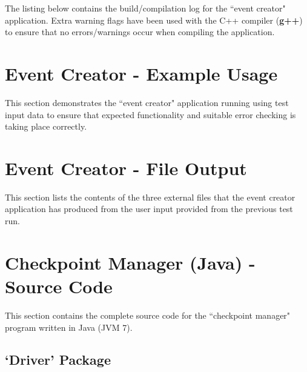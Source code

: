 \documentclass[a4paper, 10pt]{article}
\begin{document}
The listing below contains the build/compilation log for the ``event creator" application. Extra warning flags have been used with the C++ compiler (\textbf{g++}) to ensure that no errors/warnings occur when compiling the application.



\clearpage
\section{Event Creator - Example Usage}
This section demonstrates the ``event creator" application running using test input data to ensure that expected functionality and suitable error checking is taking place correctly.



\clearpage
\section{Event Creator - File Output}

This section lists the contents of the three external files that the event creator application has produced from the user input provided from the previous test run. 







\clearpage
\section{Checkpoint Manager (Java) - Source Code}
This section contains the complete source code for the ``checkpoint manager" program written in Java (JVM 7).

\subsection{`Driver' Package}
\end{document}
